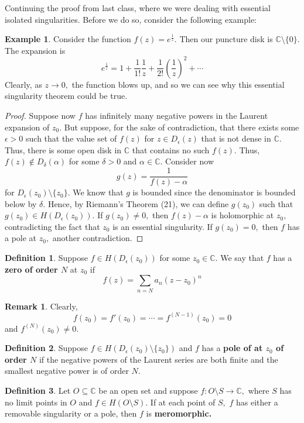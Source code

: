 \documentclass[10pt, oneside]{article}
\newcommand{\bbC}{\mathbb{C}}
\newcommand{\sm}{\setminus}
\theoremstyle{definition}
\newtheorem{exmp}{Example}[section]
\newtheorem{defn}{Definition}
\newtheorem{rem}{Remark}
\begin{document}
Continuing the proof from last class, where we were dealing with essential isolated singularities. Before we do so, consider the following example:
\begin{exmp}
    Consider the function $f(z) = e^\frac{1}{z}.$ Then our puncture disk is $\bbC\sm \{0\}.$ The expansion is
    \[e^{\frac{1}{z}} = 1 + \frac{1}{1!}\frac{1}{z} + \frac{1}{2!}(\frac{1}{z})^2 + \cdots\] Clearly, as $z\to 0,$ the function blows up, and so we can see why this essential singularity theorem could be true.
\end{exmp}
\begin{proof}
Suppose now $f$ has infinitely many negative powers in the Laurent expansion of $z_0$. But suppose, for the sake of contradiction, that there exists some $\epsilon>0$ such that the value set of $f(z)$ for $z\in D_\epsilon(z)$ that is not dense in $\bbC.$ Thus, there is some open disk in $\bbC$ that contains no such $f(z).$ Thus, $f(z) \notin D_\delta(\alpha)$ for some $\delta>0$ and $\alpha \in \bbC.$ Consider now 
\[g(z) = \frac{1}{f(z) - \alpha}\] for $D_\epsilon(z_0)\sm \{z_0\}.$ We know that $g$ is bounded since the denominator is bounded below by $\delta.$ Hence, by Riemann's Theorem (21), we can define $g(z_0)$ such that $g(z_0) \in H(D_\epsilon(z_0)).$ If $g(z_0) \neq 0,$ then $f(z) - \alpha$ is holomorphic at $z_0,$ contradicting the fact that $z_0$ is an essential singularity. If $g(z_0) = 0,$ then $f$ has a pole at $z_0,$ another contradiction.
\end{proof}

\begin{defn}
Suppose $f\in H(D_\epsilon(z_0))$ for some $z_0 \in \bbC.$
    We say that $f$ has a \textbf{zero of order $N$} at $z_0$ if 
    \[f(z) = \sum_{n = N}a_n (z - z_0)^n\]
\end{defn}
\begin{rem}
    Clearly, 
    \[f(z_0) = f'(z_0) = \cdots = f^{(N-1)}(z_0)  =0\] and $f^{(N)}(z_0) \neq 0.$
\end{rem}


\begin{defn}
    Suppose $f \in H(D_\epsilon(z_0)\sm \{z_0\})$ and $f$ has a \textbf{pole of at $z_0 $ of order $N$} if the negative powers of the Laurent series are both finite and the smallest negative power is of order $N.$
\end{defn}

\begin{defn}
    Let $O\subseteq \bbC$ be an open set and suppose $f: O\sm S \to \bbC,$ where $S$ has no limit points in $O$ and $f \in H(O \sm S).$ If at each point of $S,$ $f$ has either a removable singularity or a pole, then $f$ is \textbf{meromorphic.}
\end{defn}
\end{document}
